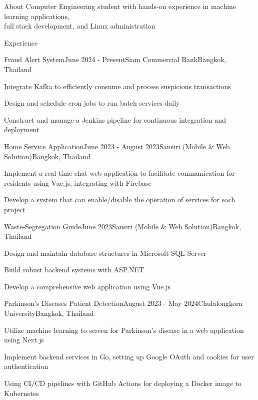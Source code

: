 \documentclass[12pt]{resume}
\begin{document}
\begin{rSection}{About}
    Computer Engineering student with hands-on experience in machine learning applications, \\
    full stack development, and Linux administration
\end{rSection}

\begin{rSection}{Experience}
    \begin{rSubsection}{Fraud Alert System}{June 2024 - Present}{Siam Commercial Bank}{Bangkok, Thailand}
        \item Integrate Kafka to efficiently consume and process suspicious transactions
        \item Design and schedule cron jobs to run batch services daily
        \item Construct and manage a Jenkins pipeline for continuous integration and deployment
    \end{rSubsection}

    \begin{rSubsection}{Home Service Application}{June 2023 - August 2023}{Sansiri (Mobile \& Web Solution)}{Bangkok, Thailand}
        \item Implement a real-time chat web application to facilitate communication for residents using Vue.js, integrating with Firebase
        \item Develop a system that can enable/disable the operation of services for each project
    \end{rSubsection}

	\begin{rSubsection}{Waste-Segregation Guide}{June 2023}{Sansiri (Mobile \& Web Solution)}{Bangkok, Thailand}
        \item Design and maintain database structures in Microsoft SQL Server
        \item Build robust backend systems with ASP.NET
        \item Develop a comprehensive web application using Vue.js
	\end{rSubsection}

	\begin{rSubsection}{Parkinson's Diseases Patient Detection}{August 2023 - May 2024}{Chulalongkorn University}{Bangkok, Thailand}
        \item Utilize machine learning to screen for Parkinson's disease in a web application using Next.js
        \item Implement backend services in Go, setting up Google OAuth and cookies for user authentication 
        \item Using CI/CD pipelines with GitHub Actions for deploying a Docker image to Kubernetes
	\end{rSubsection}

\end{rSection}
\end{document}
